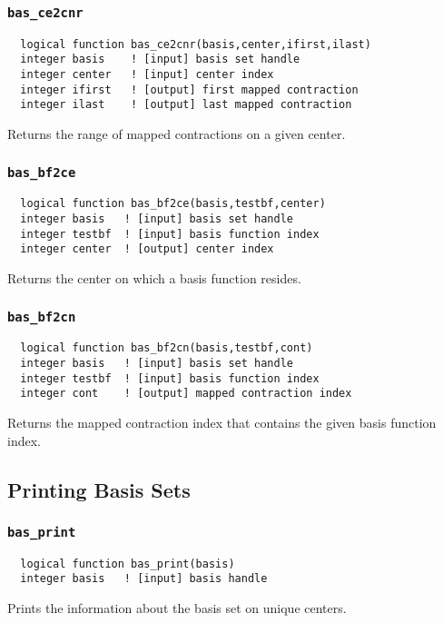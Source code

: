 \subsubsection{{\tt bas\_ce2cnr}}
\begin{verbatim}
  logical function bas_ce2cnr(basis,center,ifirst,ilast)
  integer basis    ! [input] basis set handle         
  integer center   ! [input] center index 
  integer ifirst   ! [output] first mapped contraction
  integer ilast    ! [output] last mapped contraction
\end{verbatim}
Returns the range of mapped contractions on a given center.

\subsubsection{{\tt bas\_bf2ce}}
\begin{verbatim}
  logical function bas_bf2ce(basis,testbf,center)
  integer basis   ! [input] basis set handle         
  integer testbf  ! [input] basis function index
  integer center  ! [output] center index
\end{verbatim}
Returns the center on which a basis function resides.

\subsubsection{{\tt bas\_bf2cn}}
\begin{verbatim}
  logical function bas_bf2cn(basis,testbf,cont)
  integer basis   ! [input] basis set handle         
  integer testbf  ! [input] basis function index
  integer cont    ! [output] mapped contraction index
\end{verbatim}
Returns the mapped contraction index that contains the given basis
function index.

\subsection{Printing Basis Sets}

\subsubsection{{\tt bas\_print}}
\begin{verbatim}
  logical function bas_print(basis)
  integer basis   ! [input] basis handle
\end{verbatim}
Prints the information about the basis set on unique centers.

